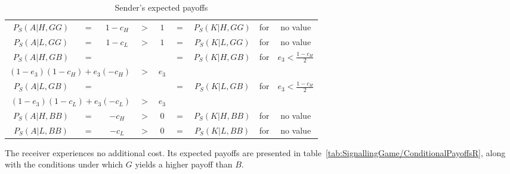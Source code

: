 \documentclass[a4paper,12pt]{article}
\numberwithin{equation}{section}
\begin{document}
\begin{table}[!h]
\begin{center}
\begin{tabular}{ccccccccc}
$P_{S}(A|H,GG)$ & $=$ & $1-c_{H}$ & $>$ & $1$ & = & $P_{S}(K|H,GG)$ & for & no value\\
$P_{S}(A|L,GG)$ & $=$ & $1-c_{L}$ & $>$ & $1$ & = & $P_{S}(K|L,GG)$ & for & no value\\
$P_{S}(A|H,GB)$ & $=$ & & & & $=$ & $P_{S}(K|H,GB)$ & \multirow{2}{*}{for} & \multirow{2}{*}{$e_{3}<\frac{1-c_{H}}{2}$}
\vspace{-1mm}\\
\multicolumn{3}{r}{\hspace{4mm}$(1-e_{3})(1-c_{H})+e_{3}(-c_{H})$} & $>$ & $e_{3}$ & & &
\vspace{1mm}\\
$P_{S}(A|L,GB)$ & $=$ & & & & $=$ & $P_{S}(K|L,GB)$ & \multirow{2}{*}{for} & \multirow{2}{*}{$e_{3}<\frac{1-c_{H}}{2}$}
\vspace{-1mm}\\
\multicolumn{3}{r}{$(1-e_{3})(1-c_{L})+e_{3}(-c_{L})$} & $>$ &$e_{3}$ & & &
\vspace{1mm}\\
$P_{S}(A|H,BB)$ & $=$ & $-c_{H}$ & $>$ & $0$ & = & $P_{S}(K|H,BB)$ & for & no value\\
$P_{S}(A|L,BB)$ & $=$ & $-c_{L}$ & $>$ & $0$ & = & $P_{S}(K|L,BB)$ & for & no value
\end{tabular}
\end{center}
\caption{Sender's expected payoffs}
\label{tab:SignallingGame/ConditionalPayoffsS}
\end{table}

\newpage

The receiver experiences no additional cost. Its expected payoffs are presented in table~\ref{tab:SignallingGame/ConditionalPayoffsR}, along with the conditions under which $G$ yields a higher payoff than $B$.
\end{document}
